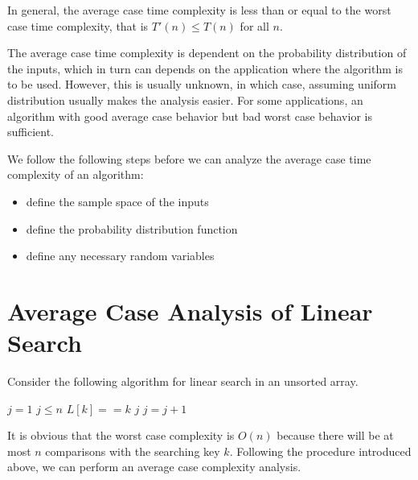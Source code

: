 In general, the average case time complexity is less than or equal to the worst case time complexity, that is $T'(n) \leq T(n)$ for all $n$.

The average case time complexity is dependent on the probability distribution of the inputs, which in turn can depends on the application where the algorithm is to be used. However, this is usually unknown, in which case, assuming uniform distribution usually makes the analysis easier. For some applications, an algorithm with good average case behavior but bad worst case behavior is sufficient.

We follow the following steps before we can analyze the average case time complexity of an algorithm:

\begin{itemize}
    \item define the sample space of the inputs
    \item define the probability distribution function
    \item define any necessary random variables
\end{itemize}

\section{Average Case Analysis of Linear Search}

Consider the following algorithm for linear search in an unsorted array.

\begin{codebox}
    \li $j = 1$
    \li \While $j \leq n$ \Do
    \li \If $L[k] == k$
    \li \Then \Return $j$ \End
    \li $j = j + 1$ \End
    \li {} 
\end{codebox}

It is obvious that the worst case complexity is $O(n)$ because there will be at most $n$ comparisons with the searching key $k$. Following the procedure introduced above, we can perform an average case complexity analysis.

